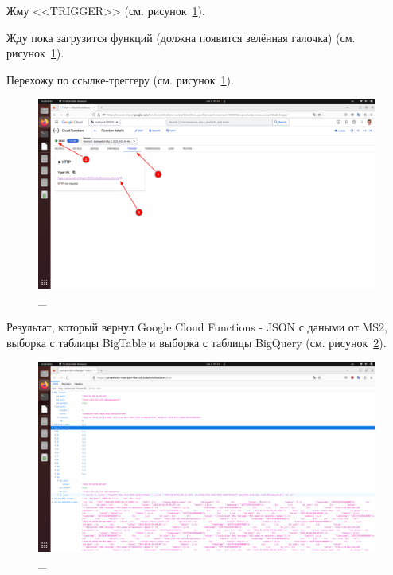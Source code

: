 \documentclass[12pt, a4paper, simple]{eskdtext}
\begin{document}
  

  \newpage

  Жму <<TRIGGER>> (см. рисунок~\ref{fig:31}).

  Жду пока загрузится функций (должна появится зелённая галочка) (см. рисунок~\ref{fig:31}).

  Перехожу по ссылке-треггеру (см. рисунок~\ref{fig:31}).

  \begin{figure}[!h]
    \centering
    \includegraphics[width=18cm]
    {images/GoogleCloudFunctions/2023-03-02_04-54-09.png}
    \caption{\_}
    \label{fig:31}
  \end{figure}

  Результат, который вернул Google Cloud Functions - JSON с даными от MS2, выборка с таблицы BigTable
  и выборка с таблицы BigQuery (см. рисунок~\ref{fig:32}).

  \begin{figure}[!h]
    \centering
    \includegraphics[width=18cm]
    {images/GoogleCloudFunctions/2023-03-02_04-55-58.png}
    \caption{\_}
    \label{fig:32}
  \end{figure}
\end{document}
